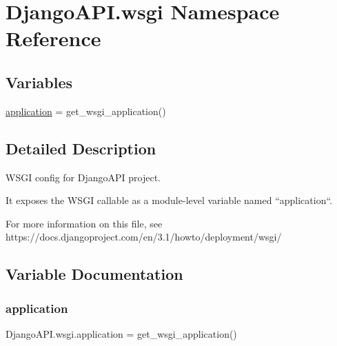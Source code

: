 \hypertarget{namespace_django_a_p_i_1_1wsgi}{}\section{Django\+A\+P\+I.\+wsgi Namespace Reference}
\label{namespace_django_a_p_i_1_1wsgi}
\subsection*{Variables}
\begin{DoxyCompactItemize}
\item 
\hyperlink{namespace_django_a_p_i_1_1wsgi_a17ce6dcb6454377b68565dee1b63fd72}{application} = get\+\_\+wsgi\+\_\+application()
\end{DoxyCompactItemize}


\subsection{Detailed Description}
\begin{DoxyVerb}WSGI config for DjangoAPI project.

It exposes the WSGI callable as a module-level variable named ``application``.

For more information on this file, see
https://docs.djangoproject.com/en/3.1/howto/deployment/wsgi/
\end{DoxyVerb}
 

\subsection{Variable Documentation}
\mbox{\label{namespace_django_a_p_i_1_1wsgi_a17ce6dcb6454377b68565dee1b63fd72}} 
\subsubsection{\texorpdfstring{application}{application}}
{\footnotesize\ttfamily Django\+A\+P\+I.\+wsgi.\+application = get\+\_\+wsgi\+\_\+application()}

